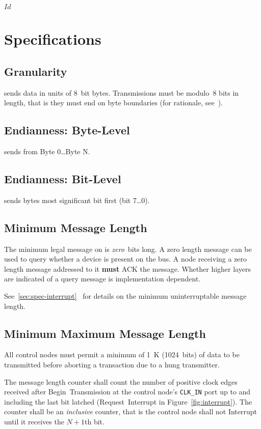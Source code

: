 \svnInfo $Id$

\section{Specifications}
\label{sec:spec}

\subsection{Granularity}
\label{sec:spec-granularity}
\bus sends data in units of 8~bit bytes. Transmissions must be modulo~8 bits
in length, that is they must end on byte boundaries (for rationale,
see~).

\subsection{Endianness: Byte-Level}
\bus sends from Byte 0{\ldots}Byte N.

\subsection{Endianness: Bit-Level}
\bus sends bytes most significant bit first (bit 7{\ldots}0).

\subsection{Minimum Message Length}
The minimum legal message on \bus is {\em zero}~bits long. A zero length
message can be used to query whether a device is present on the bus. A node
receiving a zero length message addressed to it {\bf must} ACK the message.
Whether higher layers are indicated of a query message is implementation
dependent.

See~\ref{sec:spec-interrupt}~ for details on the
minimum uninterruptable message length.

\subsection{Minimum Maximum Message Length}
All \bus control nodes must permit a minimum of 1~K (1024~bits) of data to be
transmitted before aborting a transaction due to a hung transmitter.

The message length counter shall count the number of positive clock edges
received after Begin~Transmission at the control node's {\tt CLK\_IN} port up
to and including the last bit latched (Request~Interrupt in
Figure~\ref{fig:interrupt}). The counter shall be an {\em inclusive} counter,
that is the control node shall not Interrupt until it receives the $N+1$th
bit.

